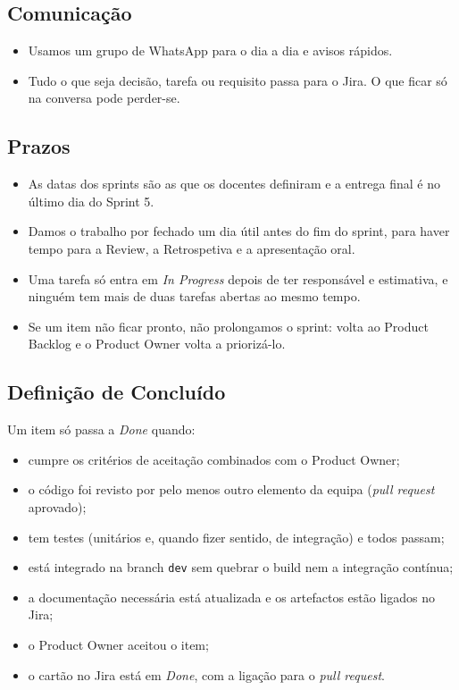 \documentclass[11pt,a4paper]{article}
\begin{document}
\subsection{Comunicação}

\begin{itemize}
  \item Usamos um grupo de WhatsApp para o dia a dia e avisos rápidos.
  \item Tudo o que seja decisão, tarefa ou requisito passa para o Jira. O que ficar só na conversa pode perder-se.
\end{itemize}

\subsection{Prazos}

\begin{itemize}
  \item As datas dos sprints são as que os docentes definiram e a entrega final é no último dia do Sprint 5.
  \item Damos o trabalho por fechado um dia útil antes do fim do sprint, para haver tempo para a Review, a Retrospetiva e a apresentação oral.
  \item Uma tarefa só entra em \textit{In Progress} depois de ter responsável e estimativa, e ninguém tem mais de duas tarefas abertas ao mesmo tempo.
  \item Se um item não ficar pronto, não prolongamos o sprint: volta ao Product Backlog e o Product Owner volta a priorizá-lo.
\end{itemize}

\subsection{Definição de Concluído}

Um item só passa a \textit{Done} quando:

\begin{tcolorbox}[caixa, title={Definição de Concluído}, colback=azulclaro!40]
  \begin{itemize}[label=\textcolor{azul}{$\square$}]
    \item cumpre os critérios de aceitação combinados com o Product Owner;
    \item o código foi revisto por pelo menos outro elemento da equipa (\textit{pull request} aprovado);
    \item tem testes (unitários e, quando fizer sentido, de integração) e todos passam;
    \item está integrado na branch \texttt{dev} sem quebrar o build nem a integração contínua;
    \item a documentação necessária está atualizada e os artefactos estão ligados no Jira;
    \item o Product Owner aceitou o item;
    \item o cartão no Jira está em \textit{Done}, com a ligação para o \textit{pull request}.
  \end{itemize}
\end{tcolorbox}
\end{document}
